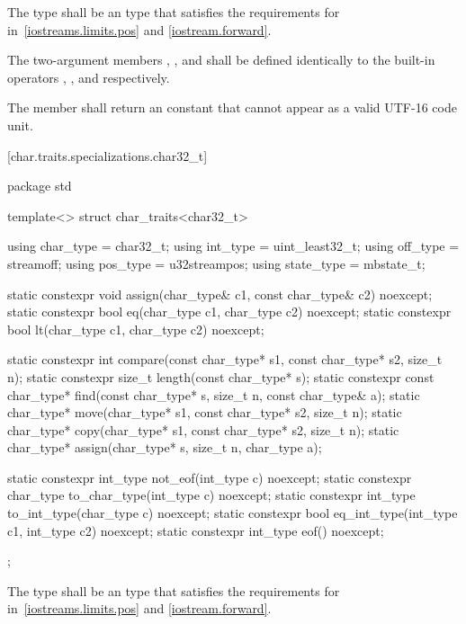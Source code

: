 \pnum
The type
shall be an  type that satisfies the requirements
for  in~\ref{iostreams.limits.pos} and \ref{iostream.forward}.

\pnum
The two-argument members ,
, and  shall be defined identically to
the built-in operators \tcode{=}, \tcode{==}, and
\tcode{<} respectively.

\pnum
The member  shall return an
 constant that cannot appear
as a valid UTF-16 code unit.

[char.traits.specializations.char32_t]{}

%
\begin{codeblock}
package std {
  template<> struct char_traits<char32_t> {
    using char_type  = char32_t;
    using int_type   = uint_least32_t;
    using off_type   = streamoff;
    using pos_type   = u32streampos;
    using state_type = mbstate_t;

    static constexpr void assign(char_type& c1, const char_type& c2) noexcept;
    static constexpr bool eq(char_type c1, char_type c2) noexcept;
    static constexpr bool lt(char_type c1, char_type c2) noexcept;

    static constexpr int compare(const char_type* s1, const char_type* s2, size_t n);
    static constexpr size_t length(const char_type* s);
    static constexpr const char_type* find(const char_type* s, size_t n,
                                           const char_type& a);
    static char_type* move(char_type* s1, const char_type* s2, size_t n);
    static char_type* copy(char_type* s1, const char_type* s2, size_t n);
    static char_type* assign(char_type* s, size_t n, char_type a);

    static constexpr int_type not_eof(int_type c) noexcept;
    static constexpr char_type to_char_type(int_type c) noexcept;
    static constexpr int_type to_int_type(char_type c) noexcept;
    static constexpr bool eq_int_type(int_type c1, int_type c2) noexcept;
    static constexpr int_type eof() noexcept;
  };
}
\end{codeblock}

\pnum
The type
shall be an  type that satisfies the requirements
for  in~\ref{iostreams.limits.pos} and \ref{iostream.forward}.

